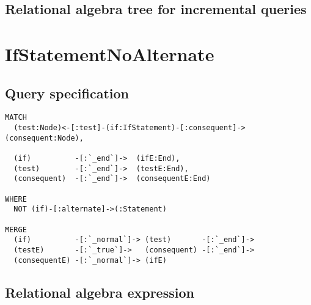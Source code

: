 \subsection*{Relational algebra tree for incremental queries}

\section{IfStatementNoAlternate}

\subsection*{Query specification}

\begin{lstlisting}
MATCH
  (test:Node)<-[:test]-(if:IfStatement)-[:consequent]->(consequent:Node),

  (if)          -[:`_end`]->  (ifE:End),
  (test)        -[:`_end`]->  (testE:End),
  (consequent)  -[:`_end`]->  (consequentE:End)

WHERE
  NOT (if)-[:alternate]->(:Statement)

MERGE
  (if)	        -[:`_normal`]-> (test)       -[:`_end`]->
  (testE)       -[:`_true`]->   (consequent) -[:`_end`]->
  (consequentE)	-[:`_normal`]-> (ifE)
\end{lstlisting}

\subsection*{Relational algebra expression}

